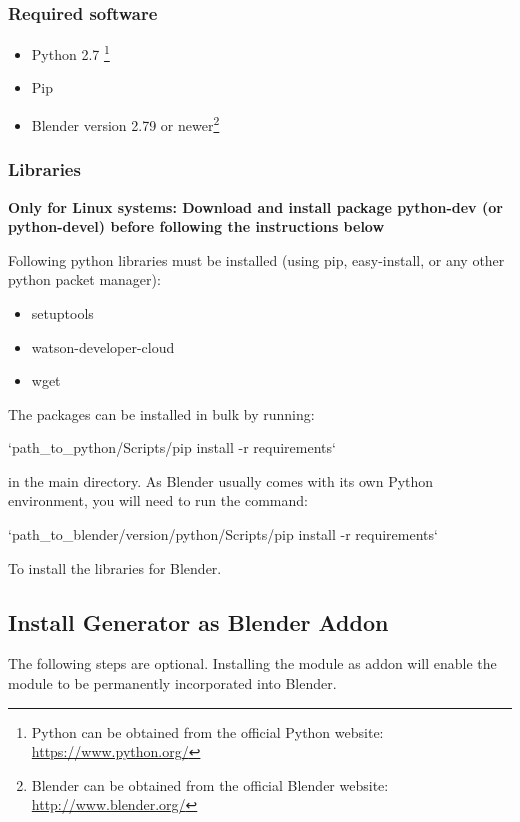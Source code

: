 \subsubsection{Required software}
\smallskip
\begin{itemize}
	\item Python 2.7 \footnote{Python can be obtained from the official Python website: \url{https://www.python.org/}}
	\item Pip
	\item Blender version 2.79 or newer\footnote{Blender can be obtained from the official Blender website:  \url{http://www.blender.org/}}
\end{itemize}

\subsubsection{Libraries}
\smallskip
\textbf{Only for Linux systems: Download and install package python-dev (or python-devel) before following the instructions below}

\noindent Following python libraries must be installed (using pip, easy-install, or any other python packet manager):
\begin{itemize}
	\item setuptools
	\item watson-developer-cloud
	\item wget
\end{itemize}
\noindent The packages can be installed in bulk by running:

\indent `path\_to\_python/Scripts/pip install -r requirements`

\noindent in the main directory. As Blender usually comes with its own Python environment, you will need to run the command:

\indent `path\_to\_blender/version/python/Scripts/pip install -r requirements`

\noindent To install the libraries for Blender.

\subsection{Install Generator as Blender Addon \label{sec:installaddon}}
The following steps are optional. Installing the module as addon will enable the module to be permanently incorporated into Blender.

